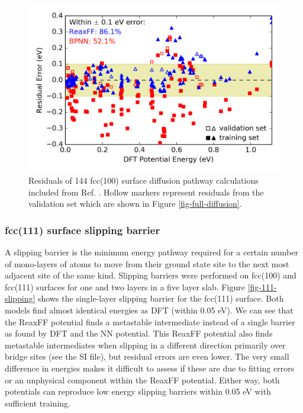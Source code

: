 \documentclass[12pt]{cmuthesis}
\begin{document}
\begin{figure}[h]
\centering
\includegraphics[width=5in]{./images/fig-barrier-residuals.png}
\caption{\label{fig-barrier-residuals}
Residuals of 144 fcc(100) surface diffusion pathway calculations included from Ref. . Hollow markers represent residuals from the validation set which are shown in Figure \ref{fig-full-diffusion}.}
\end{figure}

\subsubsection{fcc(111) surface slipping barrier}
\label{sec:org1e6fa4d}
A slipping barrier is the minimum energy pathway required for a certain number of mono-layers of atoms to move from their ground state site to the next most adjacent site of the same kind. Slipping barriers were performed on fcc(100) and fcc(111) surfaces for one and two layers in a five layer slab. Figure \ref{fig-111-slipping} shows the single-layer slipping barrier for the fcc(111) surface. Both models find almost identical energies as DFT (within 0.05 eV). We can see that the ReaxFF potential finds a metastable intermediate instead of a single barrier as found by DFT and the NN potential. This ReaxFF potential also finds metastable intermediates when slipping in a different direction primarily over bridge sites (see the SI file), but residual errors are even lower. The very small difference in energies makes it difficult to assess if these are due to fitting errors or an unphysical component within the ReaxFF potential. Either way, both potentials can reproduce low energy slipping barriers within 0.05 eV with sufficient training.
\end{document}
